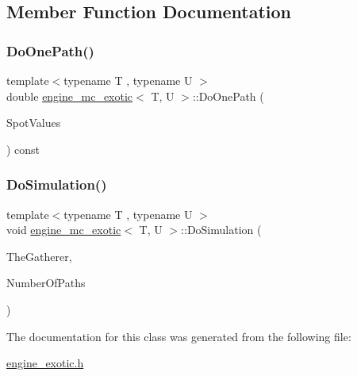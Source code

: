 \subsection{Member Function Documentation}
\hypertarget{classengine__mc__exotic_a39ee74fd980343bba205ddd7ba482455}{}\label{classengine__mc__exotic_a39ee74fd980343bba205ddd7ba482455} 
\subsubsection{\texorpdfstring{Do\+One\+Path()}{DoOnePath()}}
{\footnotesize\ttfamily template$<$typename T , typename U $>$ \\
double \hyperlink{classengine__mc__exotic}{engine\+\_\+mc\+\_\+exotic}$<$ T, U $>$\+::Do\+One\+Path (\begin{DoxyParamCaption}\item[{const \hyperlink{classMJArray}{M\+J\+Array} \&}]{Spot\+Values }\end{DoxyParamCaption}) const\hspace{0.3cm}{\ttfamily [inline]}}

\hypertarget{classengine__mc__exotic_a2987115b991c16b43f63dc9f6310ab66}{}\label{classengine__mc__exotic_a2987115b991c16b43f63dc9f6310ab66} 
\subsubsection{\texorpdfstring{Do\+Simulation()}{DoSimulation()}}
{\footnotesize\ttfamily template$<$typename T , typename U $>$ \\
void \hyperlink{classengine__mc__exotic}{engine\+\_\+mc\+\_\+exotic}$<$ T, U $>$\+::Do\+Simulation (\begin{DoxyParamCaption}\item[{\hyperlink{classStatisticsMC}{Statistics\+MC} \&}]{The\+Gatherer,  }\item[{unsigned long}]{Number\+Of\+Paths }\end{DoxyParamCaption})\hspace{0.3cm}{\ttfamily [inline]}}



The documentation for this class was generated from the following file\+:\begin{DoxyCompactItemize}
\item 
\hyperlink{engine__exotic_8h}{engine\+\_\+exotic.\+h}\end{DoxyCompactItemize}
